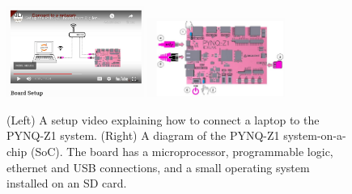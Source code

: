 \documentclass[../../../main.tex]{subfiles}
\begin{document}
\\
\vspace{0.25cm}

\begin{figure}
\centering
\includegraphics[width=0.4\textwidth]{figures/pynq1.png}
\includegraphics[width=0.4\textwidth]{figures/pynq2.png}
\caption{\label{fig:pynq} (Left) A setup video explaining how to connect a laptop to the PYNQ-Z1 system. (Right) A diagram of the PYNQ-Z1 system-on-a-chip (SoC).  The board has a microprocessor, programmable logic, ethernet and USB connections, and a small operating system installed on an SD card.}
\end{figure}
\end{document}
